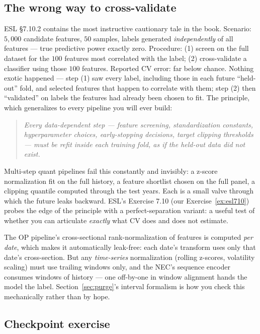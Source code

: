 \documentclass[11pt]{article}
\numberwithin{equation}{section}
\theoremstyle{plain}
\theoremstyle{definition}
\theoremstyle{remark}
\newcounter{exercise}
\begin{document}
\subsection{The wrong way to cross-validate}\label{sec:wrongway}

ESL \S7.10.2 contains the most instructive cautionary tale in the book. Scenario: $5{,}000$ candidate features, $50$ samples, labels generated \emph{independently} of all features --- true predictive power exactly zero. Procedure: (1) screen on the full dataset for the $100$ features most correlated with the label; (2) cross-validate a classifier using those $100$ features. Reported CV error: far below chance. Nothing exotic happened --- step (1) saw every label, including those in each future ``held-out'' fold, and selected features that happen to correlate with them; step (2) then ``validated'' on labels the features had already been chosen to fit. The principle, which generalizes to every pipeline you will ever build:
\begin{quote}
\emph{Every data-dependent step --- feature screening, standardization constants, hyperparameter choices, early-stopping decisions, target clipping thresholds --- must be refit inside each training fold, as if the held-out data did not exist.}
\end{quote}
Multi-step quant pipelines fail this constantly and invisibly: a z-score normalization fit on the full history, a feature shortlist chosen on the full panel, a clipping quantile computed through the test years. Each is a small valve through which the future leaks backward. ESL's Exercise 7.10 (our Exercise~\ref{ex:esl710}) probes the edge of the principle with a perfect-separation variant: a useful test of whether you can articulate \emph{exactly} what CV does and does not estimate.

\begin{necbox}
The OP pipeline's cross-sectional rank-normalization of features is computed \emph{per date}, which makes it automatically leak-free: each date's transform uses only that date's cross-section. But any \emph{time-series} normalization (rolling z-scores, volatility scaling) must use trailing windows only, and the NEC's sequence encoder consumes windows of history --- one off-by-one in window alignment hands the model the label. Section~\ref{sec:purge}'s interval formalism is how you check this mechanically rather than by hope.
\end{necbox}


\subsection*{Checkpoint exercise}
\end{document}
